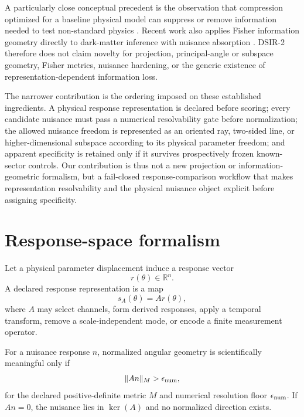 \documentclass[11pt]{article}
\begin{document}
A particularly close conceptual precedent is the observation that compression optimized for a baseline physical model can suppress or remove information needed to test non-standard physics \citep{HeavensSellentinJaffe2020NewPhysics}. Recent work also applies Fisher information geometry directly to dark-matter inference with nuisance absorption \citep{Adam2026DarkMatterInformationGeometry}. DSIR-2 therefore does not claim novelty for projection, principal-angle or subspace geometry, Fisher metrics, nuisance hardening, or the generic existence of representation-dependent information loss.

The narrower contribution is the ordering imposed on these established ingredients. A physical response representation is declared before scoring; every candidate nuisance must pass a numerical resolvability gate before normalization; the allowed nuisance freedom is represented as an oriented ray, two-sided line, or higher-dimensional subspace according to its physical parameter freedom; and apparent specificity is retained only if it survives prospectively frozen known-sector controls. Our contribution is thus not a new projection or information-geometric formalism, but a fail-closed response-comparison workflow that makes representation resolvability and the physical nuisance object explicit before assigning specificity.

\section{Response-space formalism}
Let a physical parameter displacement induce a response vector
\begin{equation}
r(\theta)\in\mathbb{R}^n.
\end{equation}
A declared response representation is a map
\begin{equation}
s_A(\theta)=A r(\theta),
\end{equation}
where $A$ may select channels, form derived responses, apply a temporal transform, remove a scale-independent mode, or encode a finite measurement operator.

For a nuisance response $n$, normalized angular geometry is scientifically meaningful only if
\begin{equation}
\|A n\|_M>\epsilon_{\rm num},
\end{equation}
for the declared positive-definite metric $M$ and numerical resolution floor $\epsilon_{\rm num}$. If $A n=0$, the nuisance lies in $\ker(A)$ and no normalized direction exists.
\end{document}
